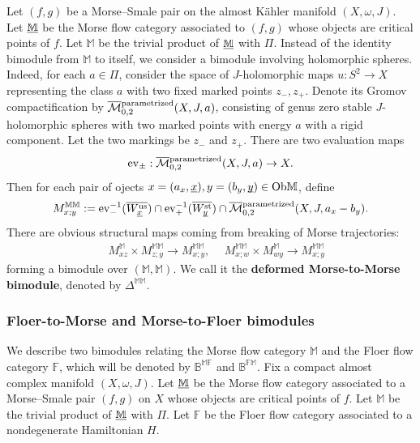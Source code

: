 \documentclass[reqno, 10pt]{amsart}
\numberwithin{equation}{section}
\numberwithin{equation}{section}
\theoremstyle{definition}
\theoremstyle{remark}
\newcommand{\beqn}{\begin{equation*}}
\newcommand{\eeqn}{\end{equation*}}
\newcommand{\ov}{\overline}
\newcommand{\mb}{\mathbb}
\newcommand{\mc}{\mathcal}
\newcommand{\uds}[1]{\underline{\smash{#1}}}
\newcommand{\ev}{{\rm ev}}
\begin{document}
Let $(f, g)$ be a Morse--Smale pair on the almost K\"ahler manifold $(X, \omega, J)$. Let $\uds{\mb M}$ be the Morse flow category associated to $(f, g)$ whose objects are critical points of $f$. Let ${\mb M}$ be the trivial product of $\uds{\mb M}$ with $\Pi$. Instead of the identity bimodule from ${\mb M}$ to itself, we consider a bimodule involving holomorphic spheres. Indeed, for each $a \in \Pi$, consider the space of $J$-holomorphic maps $u: S^2 \to X$ representing the class $a$ with two fixed marked points $z_-, z_+$. Denote its Gromov compactification by $\ov{\mc M}{}_{0,2}^{\rm parametrized} (X, J, a)$, consisting of genus zero stable $J$-holomorphic spheres with two marked points with energy $a$ with a rigid component. Let the two markings be $z_-$ and $z_+$. There are two evaluation maps
\beqn
\ev_\pm: \ov{\mc M}{}_{0,2}^{\rm parametrized} (X, J, a) \to X.
\eeqn
Then for each pair of ojects $x = (a_x, \uds x), y = (b_y, \uds y) \in {\rm Ob}{\mb M}$, define
\beqn
M_{x;y}^{\mb{MM}}:= \ev_-^{-1}( \ov{W_{\uds x}^{\rm us}}) \cap \ev_+^{-1}( \ov{W_{\uds y}^{\rm st}}) \cap \ov{\mc M}{}_{0,2}^{\rm parametrized} (X, J, a_x - b_y).
\eeqn
There are obvious structural maps coming from breaking of Morse trajectories:
\begin{align*}
    &\ M_{xz}^{\mb M} \times M_{z;y}^{\mb{MM}} \to M_{x;y}^{\mb{MM}},\ &\ M_{x;w}^{\mb{MM}}\times M_{wy}^{\mb{M}} \to M_{x;y}^{\mb{MM}}
\end{align*}
forming a bimodule over $({\mb M}, {\mb M})$. We call it the {\bf deformed Morse-to-Morse bimodule}, denoted by $\mb{\Delta}^{\mb{MM}}$.







\subsubsection{Floer-to-Morse and Morse-to-Floer bimodules}

We describe two bimodules relating the Morse flow category ${\mb M}$ and the Floer flow category ${\mb F}$, which will be denoted by ${\mb B}^{\mb{MF}}$ and $\mb{B}^{\mb{FM}}$. Fix a compact almost complex manifold $(X, \omega, J)$. Let $\uds{\mb M}$ be the Morse flow category associated to a Morse--Smale pair $(f, g)$ on $X$ whose objects are critical points of $f$. Let ${\mb M}$ be the trivial product of $\uds{\mb M}$ with $\Pi$. Let ${\mb F}$ be the Floer flow category associated to a nondegenerate Hamiltonian $H$. 
\end{document}
